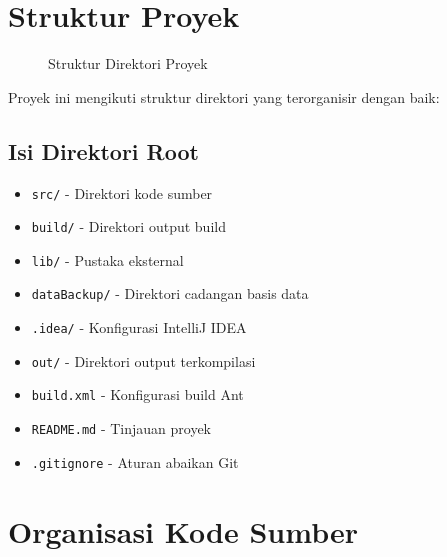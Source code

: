 \documentclass[12pt,a4paper]{article}
\begin{document}
\section{Struktur Proyek}

\begin{figure}[h]
\centering
{}
\caption{Struktur Direktori Proyek}
\end{figure}

Proyek ini mengikuti struktur direktori yang terorganisir dengan baik:

\subsection{Isi Direktori Root}
\begin{itemize}
    \item \texttt{src/} - Direktori kode sumber
    \item \texttt{build/} - Direktori output build
    \item \texttt{lib/} - Pustaka eksternal
    \item \texttt{dataBackup/} - Direktori cadangan basis data
    \item \texttt{.idea/} - Konfigurasi IntelliJ IDEA
    \item \texttt{out/} - Direktori output terkompilasi
    \item \texttt{build.xml} - Konfigurasi build Ant
    \item \texttt{README.md} - Tinjauan proyek
    \item \texttt{.gitignore} - Aturan abaikan Git
\end{itemize}

\section{Organisasi Kode Sumber}
\end{document}
